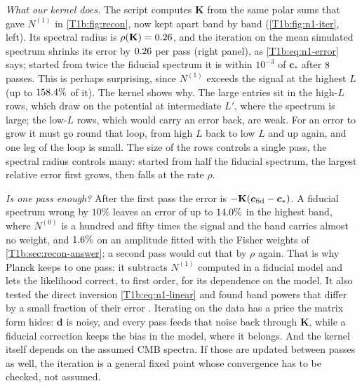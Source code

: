 \emph{What our kernel does.} The script computes $\mathbf K$ from the same polar sums that gave $N^{(1)}$ in \cref{T1b:fig:recon}, now kept apart band by band (\cref{T1b:fig:n1-iter}, left). Its spectral radius is $\rho(\mathbf K)=0.26$, and the iteration on the mean simulated spectrum shrinks its error by $0.26$ per pass (right panel), as \eqref{T1b:eq:n1-error} says; started from twice the fiducial spectrum it is within $10^{-3}$ of $\bm c_*$ after $8$ passes. This is perhaps surprising, since $N^{(1)}$ exceeds the signal at the highest $L$ (up to $158.4\%$ of it). The kernel shows why. The large entries sit in the high-$L$ rows, which draw on the potential at intermediate $L'$, where the spectrum is large; the low-$L$ rows, which would carry an error back, are weak. For an error to grow it must go round that loop, from high $L$ back to low $L$ and up again, and one leg of the loop is small. The size of the rows controls a single pass, the spectral radius controls many: started from half the fiducial spectrum, the largest relative error first grows, then falls at the rate $\rho$.

\emph{Is one pass enough?} After the first pass the error is $-\mathbf K(\bm c_{\rm fid}-\bm c_*)$. A fiducial spectrum wrong by $10\%$ leaves an error of up to $14.0\%$ in the highest band, where $N^{(0)}$ is a hundred and fifty times the signal and the band carries almost no weight, and $1.6\%$ on an amplitude fitted with the Fisher weights of \cref{T1b:sec:recon-answer}; a second pass would cut that by $\rho$ again. That is why Planck keeps to one pass: it subtracts $N^{(1)}$ computed in a fiducial model and lets the likelihood correct, to first order, for its dependence on the model. It also tested the direct inversion \eqref{T1b:eq:n1-linear} and found band powers that differ by a small fraction of their error \cite{Planck2018VIII}. Iterating on the data has a price the matrix form hides: $\bm d$ is noisy, and every pass feeds that noise back through $\mathbf K$, while a fiducial correction keeps the bias in the model, where it belongs. And the kernel itself depends on the assumed CMB spectra. If those are updated between passes as well, the iteration is a general fixed point whose convergence has to be checked, not assumed.

